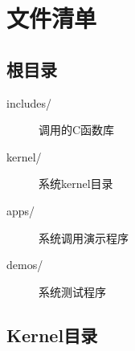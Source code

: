 \chapter{文件清单}

\section{根目录}
\begin{description}
    \item[includes/] 调用的C函数库
    \item[kernel/] 系统kernel目录
    \item[apps/] 系统调用演示程序
    \item[demos/] 系统测试程序
\end{description}

\section{Kernel目录}
